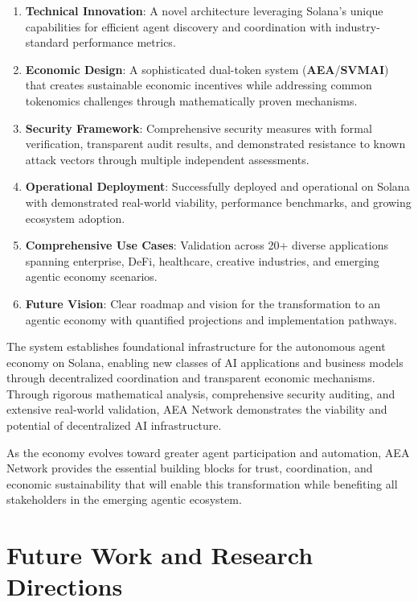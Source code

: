 \documentclass[12pt,a4paper]{article}
\begin{document}
\begin{enumerate}
\item \textbf{Technical Innovation}: A novel architecture leveraging Solana's unique capabilities for efficient agent discovery and coordination with industry-standard performance metrics.

\item \textbf{Economic Design}: A sophisticated dual-token system (\textbf{AEA}/\textbf{SVMAI}) that creates sustainable economic incentives while addressing common tokenomics challenges through mathematically proven mechanisms.

\item \textbf{Security Framework}: Comprehensive security measures with formal verification, transparent audit results, and demonstrated resistance to known attack vectors through multiple independent assessments.

\item \textbf{Operational Deployment}: Successfully deployed and operational on Solana with demonstrated real-world viability, performance benchmarks, and growing ecosystem adoption.

\item \textbf{Comprehensive Use Cases}: Validation across 20+ diverse applications spanning enterprise, DeFi, healthcare, creative industries, and emerging agentic economy scenarios.

\item \textbf{Future Vision}: Clear roadmap and vision for the transformation to an agentic economy with quantified projections and implementation pathways.
\end{enumerate}

The system establishes foundational infrastructure for the autonomous agent economy on Solana, enabling new classes of AI applications and business models through decentralized coordination and transparent economic mechanisms. Through rigorous mathematical analysis, comprehensive security auditing, and extensive real-world validation, AEA Network demonstrates the viability and potential of decentralized AI infrastructure.

As the economy evolves toward greater agent participation and automation, AEA Network provides the essential building blocks for trust, coordination, and economic sustainability that will enable this transformation while benefiting all stakeholders in the emerging agentic ecosystem.

\section{Future Work and Research Directions}
\end{document}
